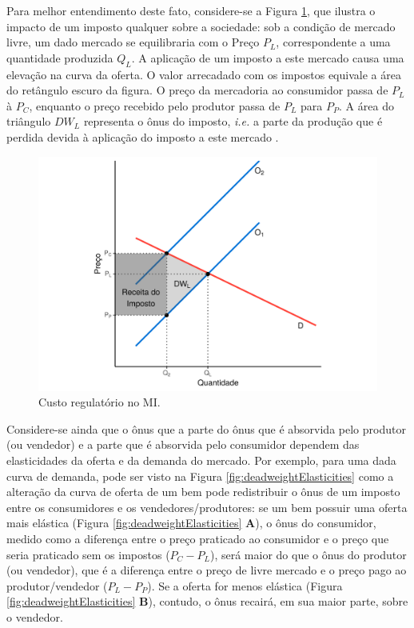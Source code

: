\documentclass[
	12pt,				%
	oneside,			%
	a4paper,			%
	chapter=TITLE,		%
	section=TITLE,		%
	english,			%
	brazil				%
	]{abntex2}
\begin{document}
\begin{refsection}
Para melhor entendimento deste fato, considere-se a Figura
\ref{fig:deadweight}, que ilustra o impacto de um imposto qualquer sobre a
sociedade: sob a condição de mercado livre, um dado mercado se equilibraria com
o Preço \(P_L\), correspondente a uma quantidade produzida \(Q_L\). A aplicação de
um imposto a este mercado causa uma elevação na curva da oferta. O valor
arrecadado com os impostos equivale a área do retângulo escuro da figura. O
preço da mercadoria ao consumidor passa de \(P_L\) à \(P_C\), enquanto o preço
recebido pelo produtor passa de \(P_L\) para \(P_P\). A área do triângulo \(DW_L\)
representa o ônus do imposto, \emph{i.e.} a parte da produção que é perdida devida à
aplicação do imposto a este mercado \autocite[p.322-324]{varian}.
\begin{figure}[H]

{\centering \includegraphics[width=0.7\linewidth]{images/deadweight-1} 

}

\caption{Custo regulatório no \gls{MI}.}\label{fig:deadweight}
\end{figure}
Considere-se ainda que o ônus que a parte do ônus que é absorvida pelo produtor
(ou vendedor) e a parte que é absorvida pelo consumidor dependem das
elasticidades da oferta e da demanda do mercado. Por exemplo, para uma dada
curva de demanda, pode ser visto na Figura \ref{fig:deadweightElasticities}
como a alteração da curva de oferta de um bem pode redistribuir o ônus de um
imposto entre os consumidores e os vendedores/produtores: se um bem possuir uma
oferta mais elástica (Figura \ref{fig:deadweightElasticities} \textbf{A}), o ônus do
consumidor, medido como a diferença entre o preço praticado ao consumidor e o
preço que seria praticado sem os impostos (\(P_C - P_L\)), será maior do que o
ônus do produtor (ou vendedor), que é a diferença entre o preço de livre mercado
e o preço pago ao produtor/vendedor (\(P_L - P_P\)). Se a oferta for menos
elástica (Figura \ref{fig:deadweightElasticities} \textbf{B}), contudo, o ônus
recairá, em sua maior parte, sobre o vendedor.
\begin{figure}[H]


\end{figure}
\end{refsection}
\end{document}
